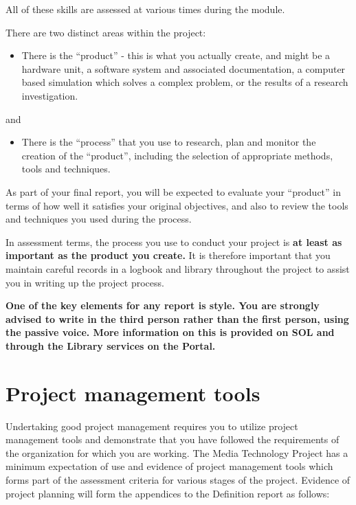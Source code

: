 All of these skills are assessed at various times during the module.

There are two distinct areas within the project:

\begin{itemize}
    \item There is the “product” - this is what you actually create, and might be a hardware unit, a
    software system and associated documentation, a computer based simulation which
    solves a complex problem, or the results of a research investigation.
\end{itemize}

and

\begin{itemize}
    \item There is the “process” that you use to research, plan and monitor the creation of the
    “product”, including the selection of appropriate methods, tools and techniques.
\end{itemize}

As part of your final report, you will be expected to evaluate your “product” in terms of how well it satisfies your original objectives, and also to review the tools and techniques you used during the process.

In assessment terms, the process you use to conduct your project is \textbf{at least as important as the product you create.} It is therefore important that you maintain careful records in a logbook and library throughout the project to assist you in writing up the project process.

\textbf{One of the key elements for any report is style. You are strongly advised to write in the third person rather than the first person, using the passive voice. More information on this is provided on SOL and through the Library services on the Portal.}

\section*{Project management tools}

Undertaking good project management requires you to utilize project management tools and
demonstrate that you have followed the requirements of the organization for which you are
working. The Media Technology Project has a minimum expectation of use and evidence of project management tools which forms part of the assessment criteria for various stages of the project. Evidence of project planning will form the appendices to the Definition report as follows:


